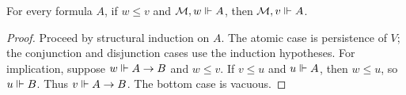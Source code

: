 \begin{lemma}[Persistence]
For every formula \(A\), if \(w\leq v\) and \(\mathcal M,w\Vdash A\), then
\(\mathcal M,v\Vdash A\).
\end{lemma}

\begin{proof}
Proceed by structural induction on \(A\).  The atomic case is persistence of
\(V\); the conjunction and disjunction cases use the induction hypotheses.
For implication, suppose \(w\Vdash A\to B\) and \(w\leq v\).  If
\(v\leq u\) and \(u\Vdash A\), then \(w\leq u\), so \(u\Vdash B\).
Thus \(v\Vdash A\to B\).  The bottom case is vacuous.
\end{proof}
